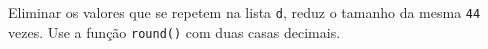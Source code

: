 \documentclass[12pt,varwidth=16cm,border=1pt]{standalone}
\begin{document}
Eliminar os valores que se repetem na lista \verb+d+, reduz o tamanho da mesma \verb+44+ vezes. Use a função \verb+round()+ com duas casas decimais.

\questiomtrue
\end{document}
